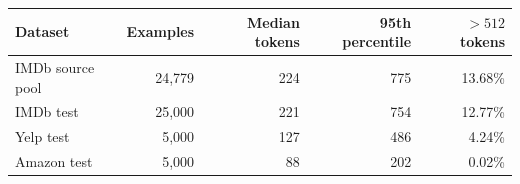 \begin{tabular}{lrrrr}\toprule
Dataset & Examples & Median tokens & 95th percentile & $>512$ tokens\\\midrule
IMDb source pool & 24,779 & 224 & 775 & 13.68\%\\
IMDb test & 25,000 & 221 & 754 & 12.77\%\\
Yelp test & 5,000 & 127 & 486 & 4.24\%\\
Amazon test & 5,000 & 88 & 202 & 0.02\%\\
\bottomrule\end{tabular}
